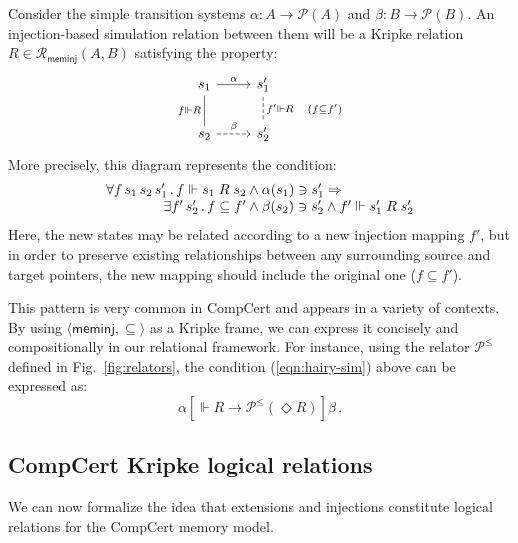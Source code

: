 \documentclass[acmsmall,authordraft]{acmart}
\newcommand{\kw}[1]{\ensuremath{ \mathsf{#1} }}
\newcommand{\ifr}[1]{\mathrel{[{#1}]}}
\begin{document}
\begin{example} \label{ex:sim} %
Consider the simple transition systems
$\alpha : A \rightarrow \mathcal{P}(A)$ and
$\beta : B \rightarrow \mathcal{P}(B)$.
An injection-based simulation relation between them
will be a Kripke relation
$R \in \mathcal{R}_\kw{meminj}(A, B)$
satisfying the property:
\[
  \begin{tikzcd}
    s_1 \arrow[r, "\alpha"]
        \arrow[d, dash, "f \Vdash R"'] &
    s_1' \arrow[d, dashed, dash, "f' \Vdash R \quad (f \subseteq f')"] \\
    s_2 \arrow[r, dashed, "\beta"] &
    s_2'
  \end{tikzcd}
\]
More precisely, this diagram represents the condition:
\begin{equation}
    \label{eqn:hairy-sim}
    \begin{array}{r@{}l}
    \forall f \, s_1 \, s_2 \, s_1' \,.\,
      f \Vdash s_1 \mathrel{R} s_2 &{} \wedge
      \alpha(s_1) \ni s_1' \Rightarrow \\
    \exists f' \, s_2' \,.\,
      f \subseteq f' &{} \wedge
      \beta(s_2) \ni s_2' \wedge
      f' \Vdash s_1' \mathrel{R} s_2'
    \end{array}
\end{equation}
Here, the new states may be related according to
a new injection mapping $f'$,
but in order to preserve existing relationships
between any surrounding source and target pointers,
the new mapping should include
the original one ($f \subseteq f'$).

This pattern is very common in CompCert
and appears in a variety of contexts.
By using $\langle \kw{meminj}, {\subseteq} \rangle$
as a Kripke frame,
we can express it concisely and compositionally
in our relational framework.
For instance,
using the relator $\mathcal{P}^\le$ defined in
Fig.~\ref{fig:relators},
the condition (\ref{eqn:hairy-sim}) above can be expressed
as:
\[
  \alpha \ifr{\Vdash R \rightarrow \mathcal{P}^\le(\Diamond R)} \beta \,.
\]
\end{example}


\subsection{CompCert Kripke logical relations} \label{sec:cklrdef} %

We can now formalize the idea that
extensions and injections
constitute logical relations for the CompCert memory model.
\end{document}
